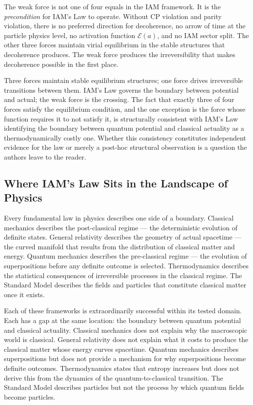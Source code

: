 \documentclass[12pt,a4paper]{article}
\begin{document}
The weak force is not one of four equals in the IAM framework.
It is the \textit{precondition} for IAM's Law to operate. Without
CP violation and parity violation, there is no preferred direction
for decoherence, no arrow of time at the particle physics level,
no activation function $\mathcal{E}(a)$, and no IAM sector split.
The other three forces maintain virial equilibrium in the stable
structures that decoherence produces. The weak force produces the
irreversibility that makes decoherence possible in the first place.

Three forces maintain stable equilibrium structures; one force
drives irreversible transitions between them. IAM's Law governs
the boundary between potential and actual; the weak force is the
crossing. The fact that exactly three of four forces satisfy the
equilibrium condition, and the one exception is the force whose
function requires it to not satisfy it, is structurally consistent
with IAM's Law identifying the boundary between quantum potential
and classical actuality as a thermodynamically costly one. Whether
this consistency constitutes independent evidence for the law or
merely a post-hoc structural observation is a question the authors
leave to the reader.

\subsection{Where IAM's Law Sits in the Landscape of Physics}

Every fundamental law in physics describes one side of a boundary.
Classical mechanics describes the post-classical regime --- the
deterministic evolution of definite states. General relativity
describes the geometry of actual spacetime --- the curved manifold
that results from the distribution of classical matter and energy.
Quantum mechanics describes the pre-classical regime --- the
evolution of superpositions before any definite outcome is selected.
Thermodynamics describes the statistical consequences of irreversible
processes in the classical regime. The Standard Model describes the
fields and particles that constitute classical matter once it exists.

Each of these frameworks is extraordinarily successful within its
tested domain. Each has a gap at the same location: the boundary
between quantum potential and classical actuality. Classical mechanics does
not explain why the macroscopic world is classical. General
relativity does not explain what it costs to produce the classical
matter whose energy curves spacetime. Quantum mechanics describes
superpositions but does not provide a mechanism for why superpositions
become definite outcomes. Thermodynamics states that entropy increases
but does not derive this from the dynamics of the quantum-to-classical
transition. The Standard Model describes particles but not the process
by which quantum fields become particles.
\end{document}

